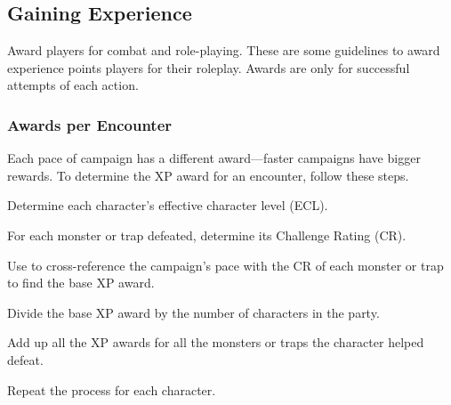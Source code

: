 
\subsection{Gaining Experience}
Award players for combat and role-playing. These are some guidelines to award experience points players for their roleplay. Awards are only for successful attempts of each action.

\subsubsection{Awards per Encounter}
Each pace of campaign has a different award---faster campaigns have bigger rewards. To determine the XP award for an encounter, follow these steps.
\begin{enumerate*}
	\item Determine each character's effective character level (ECL).
	\item For each monster or trap defeated, determine its Challenge Rating (CR).
	\item Use  to cross-reference the campaign's pace with the CR of each monster or trap to find the base XP award.
	\item Divide the base XP award by the number of characters in the party.
	\item Add up all the XP awards for all the monsters or traps the character helped defeat.
	\item Repeat the process for each character.
\end{enumerate*}

